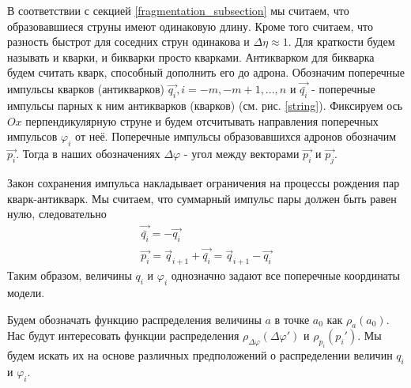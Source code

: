 \documentclass[12pt]{article}
\renewcommand{\l}{\left( }
\renewcommand{\r}{\right) }
\renewcommand{\phi}{\varphi}
\newcommand{\br}[1]{\l {#1} \r}
\begin{document}
В соответствии с секцией \ref{fragmentation_subsection} мы считаем, что образовавшиеся струны имеют одинаковую длину. Кроме того считаем, что разность быстрот для соседних струн одинакова и $\Delta \eta \approx 1$. Для краткости будем называть и кварки, и бикварки просто кварками. Антикварком для бикварка будем считать кварк, способный дополнить его до адрона. Обозначим поперечные импульсы кварков (антикварков) $\vec{q_i}, i = -m, -m + 1, ... , n$ и $\vec{\bar{q_i}}$ - поперечные импульсы парных к ним антикварков (кварков) (см. рис. \ref{string}). Фиксируем ось $Ox$ перпендикулярную струне и будем отсчитывать направления поперечных импульсов $\phi_i$ от неё. Поперечные импульсы образовавшихся адронов обозначим $\vec{p_i}$. Тогда в наших обозначениях $\Delta \phi$ - угол между векторами $\vec{p_i}$ и $\vec{p_j}$.

Закон сохранения импульса накладывает ограничения на процессы рождения пар кварк-антикварк. Мы считаем, что суммарный импульс пары должен быть равен нулю, следовательно
\begin{gather}
\vec{\bar{q_i}} = -\vec{q_i} \\
\vec{p_i} = \vec{q}_{i+1} + \vec{\bar{q_i}} = \vec{q}_{i+1} - \vec{q_i}
\end{gather}
Таким образом, величины $q_i$ и $\phi_i$ однозначно задают все поперечные координаты модели.

Будем обозначать функцию распределения величины $a$ в точке $a_0$ как $\rho_a \br{a_0}$. Нас будут интересовать функции распределения $\rho_{\Delta \phi} \br{\Delta \phi'}$ и $\rho_{p_i} \br{p_i'}$. Мы будем искать их на основе различных предположений о распределении величин $q_i$ и $\phi_i$.
\end{document}
